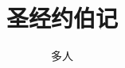 \documentclass[12pt,oneside]{book}
\begin{document}
\title{圣经约伯记}
\author{多人}

\makemytitleA
\end{document}
